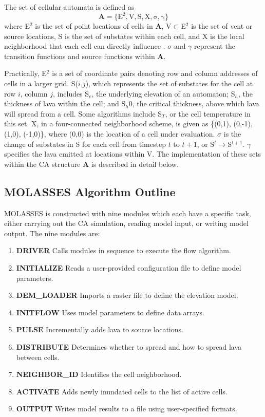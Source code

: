 \documentclass[12pt,letter]{article}
\begin{document}
The set of cellular automata is defined as
	\begin{equation}
		\mathbf{A} = \mathrm{\{E^2, V, S, X, \sigma, \gamma\}}
	\end{equation}
	where E$^2$ is the set of point locations of cells in \textbf{A}, V$\subset$E$^2$ is the set of vent or source locations, S is the set of substates within each cell, and X is the local neighborhood that each cell can directly influence \citep{barca1994cellular}. $\sigma$ and $\gamma$ represent the transition functions and source functions within \textbf{A}. 
	
	Practically, E$^2$ is a set of coordinate pairs denoting row and column addresses of cells in a larger grid. S($i$,$j$), which represents the set of substates for the cell at row $i$, column $j$, includes S$_e$, the underlying elevation of an automaton; S$_h$, the thickness of lava within the cell; and S$_h0$, the critical thickness, above which lava will spread from a cell. Some algorithms include S$_T$, or the cell temperature in this set. X, in a four-connected neighborhood scheme, is given as \{(0,1), (0,-1), (1,0), (-1,0)\}, where (0,0) is the location of a cell under evaluation. $\sigma$ is the change of substates in S for each cell from timestep $t$ to $t+1$, or S$^{t}\rightarrow$S$^{t+1}$. $\gamma$ specifies the lava emitted at locations within V. The implementation of these sets within the CA structure \textbf{A} is described in detail below.
	
	\subsection{MOLASSES Algorithm Outline}
		MOLASSES is constructed with nine modules which each have a specific task, either carrying out the CA simulation, reading model input, or writing model output. The nine modules are:
		\begin{enumerate}
			\item{\textbf{DRIVER}} Calls modules in sequence to execute the flow algorithm.
			\item{\textbf{INITIALIZE}} Reads a user-provided configuration file to define model parameters.
			\item{\textbf{DEM\_LOADER}} Imports a raster file to define the elevation model.
			\item{\textbf{INITFLOW}} Uses model parameters to define data arrays.
			\item{\textbf{PULSE}} Incrementally adds lava to source locations.
			\item{\textbf{DISTRIBUTE}} Determines whether to spread and how to spread lava between cells.
			\item{\textbf{NEIGHBOR\_ID}} Identifies the cell neighborhood.
			\item{\textbf{ACTIVATE}} Adds newly inundated cells to the list of active cells.
			\item{\textbf{OUTPUT}} Writes model results to a file using user-specified formats.
		\end{enumerate}
		
\end{document}

